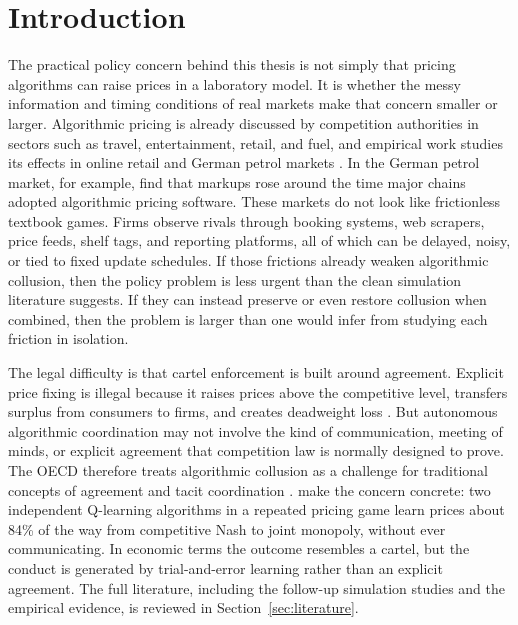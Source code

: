 \section{Introduction}
\label{sec:introduction}

The practical policy concern behind this thesis is not simply that pricing algorithms can raise prices in a laboratory model. It is whether the messy information and timing conditions of real markets make that concern smaller or larger. Algorithmic pricing is already discussed by competition authorities in sectors such as travel, entertainment, retail, and fuel, and empirical work studies its effects in online retail and German petrol markets \citep{oecd2025,brown2023,assad2024}. In the German petrol market, for example, \citet{assad2024} find that markups rose around the time major chains adopted algorithmic pricing software. These markets do not look like frictionless textbook games. Firms observe rivals through booking systems, web scrapers, price feeds, shelf tags, and reporting platforms, all of which can be delayed, noisy, or tied to fixed update schedules. If those frictions already weaken algorithmic collusion, then the policy problem is less urgent than the clean simulation literature suggests. If they can instead preserve or even restore collusion when combined, then the problem is larger than one would infer from studying each friction in isolation.

The legal difficulty is that cartel enforcement is built around agreement. Explicit price fixing is illegal because it raises prices above the competitive level, transfers surplus from consumers to firms, and creates deadweight loss \citep{businessgovnl}. But autonomous algorithmic coordination may not involve the kind of communication, meeting of minds, or explicit agreement that competition law is normally designed to prove. The OECD therefore treats algorithmic collusion as a challenge for traditional concepts of agreement and tacit coordination \citep{oecd2017,oecd2025}. \citet{calvano2020} make the concern concrete: two independent Q-learning algorithms in a repeated pricing game learn prices about 84\% of the way from competitive Nash to joint monopoly, without ever communicating. In economic terms the outcome resembles a cartel, but the conduct is generated by trial-and-error learning rather than an explicit agreement. The full literature, including the follow-up simulation studies and the empirical evidence, is reviewed in Section~\ref{sec:literature}.

